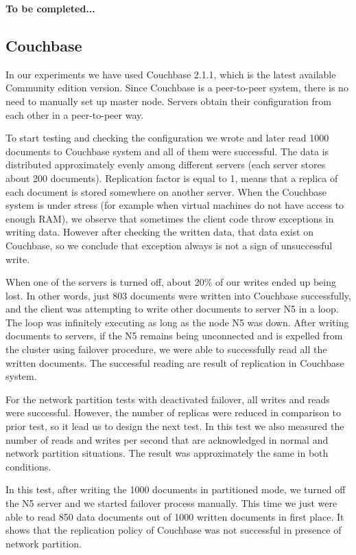 \documentclass[a4paper]{article}
\begin{document}
{\bf To be completed...}

\subsection{Couchbase}

In our experiments we have used Couchbase 2.1.1, which is the latest available Community edition version. 
Since Couchbase is a peer-to-peer system, there is no need to manually set up master node. 
Servers obtain their configuration from each other in a peer-to-peer way.

To start testing and checking the configuration we wrote and later read 1000 documents to Couchbase system and all of them were successful. 
The data is distributed approximately evenly among different servers (each server stores about 200 documents).
Replication factor is equal to 1, means that a replica of each document is stored somewhere on another server.
When the Couchbase system is under stress (for example when virtual machines do not have access to enough RAM), we observe that sometimes the client code throw exceptions in writing data.
However after checking the written data, that data exist on Couchbase, so we conclude that exception always is not a sign of unsuccessful write.  

When one of the servers is turned off, about 20\% of our writes ended up being lost.
In other words, just 803 documents were written into Couchbase successfully, and the client was attempting to write other documents to server N5 in a loop.
The loop was infinitely executing as long as the node N5 was down.
After writing documents to servers, if the N5 remains being unconnected and is expelled from the cluster using failover procedure, we were able to successfully read all the written documents.
The successful reading are result of replication in Couchbase system.

For the network partition tests with deactivated failover, all writes and reads were successful.  
However, the number of replicas were reduced in comparison to prior test, so it lead us to design the next test. 
In this test we also measured the number of reads and writes per second that are acknowledged in normal and network partition situations.
The result was approximately the same in both conditions.

In this test, after writing the 1000 documents in partitioned mode, we turned off the N5 server and we started failover process manually.
This time we just were able to read 850 data documents out of 1000 written documents in first place. 
It shows that the replication policy of Couchbase was not successful in presence of network partition.
\end{document}
